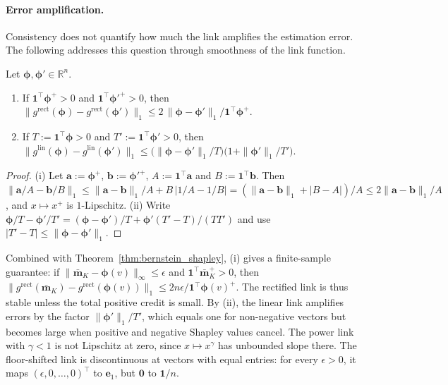 \paragraph{Error amplification.}
Consistency does not quantify how much the link amplifies the estimation error. The following addresses this question through smoothness of the link function.

\begin{proposition}\label{prop:link_lipschitz}
Let $\boldsymbol{\phi}, \boldsymbol{\phi}' \in \mathbb{R}^n$.
\begin{enumerate}
    \item[(i)] If $\mathbf{1}^\top \boldsymbol{\phi}^+ > 0$ and $\mathbf{1}^\top \boldsymbol{\phi}'^+ > 0$, then $\big\| g^{\text{rect}}(\boldsymbol{\phi}) - g^{\text{rect}}(\boldsymbol{\phi}') \big\|_1 \le 2\, \|\boldsymbol{\phi} - \boldsymbol{\phi}'\|_1 / \mathbf{1}^\top \boldsymbol{\phi}^+$.
    \item[(ii)] If $T := \mathbf{1}^\top \boldsymbol{\phi} > 0$ and $T' := \mathbf{1}^\top \boldsymbol{\phi}' > 0$, then $\big\| g^{\text{lin}}(\boldsymbol{\phi}) - g^{\text{lin}}(\boldsymbol{\phi}') \big\|_1 \le \big( \|\boldsymbol{\phi} - \boldsymbol{\phi}'\|_1 / T \big) \big( 1 + \|\boldsymbol{\phi}'\|_1 / T' \big)$.
\end{enumerate}
\end{proposition}

\begin{proof}
(i) Let $\mathbf{a} := \boldsymbol{\phi}^+$, $\mathbf{b} := \boldsymbol{\phi}'^+$, $A := \mathbf{1}^\top \mathbf{a}$ and $B := \mathbf{1}^\top \mathbf{b}$. Then $\|\mathbf{a}/A - \mathbf{b}/B\|_1 \le \|\mathbf{a} - \mathbf{b}\|_1 / A + B\, |1/A - 1/B| = (\|\mathbf{a} - \mathbf{b}\|_1 + |B - A|)/A \le 2\|\mathbf{a} - \mathbf{b}\|_1 / A$, and $x \mapsto x^+$ is $1$-Lipschitz. (ii) Write $\boldsymbol{\phi}/T - \boldsymbol{\phi}'/T' = (\boldsymbol{\phi} - \boldsymbol{\phi}')/T + \boldsymbol{\phi}'(T' - T)/(T T')$ and use $|T' - T| \le \|\boldsymbol{\phi} - \boldsymbol{\phi}'\|_1$.
\end{proof}

Combined with Theorem~\ref{thm:bernstein_shapley}, (i) gives a finite-sample guarantee: if $\|\bar{\mathbf{m}}_K - \boldsymbol{\phi}(v)\|_\infty \le \epsilon$ and $\mathbf{1}^\top \bar{\mathbf{m}}_K^+ > 0$, then $\|g^{\text{rect}}(\bar{\mathbf{m}}_K) - g^{\text{rect}}(\boldsymbol{\phi}(v))\|_1 \le 2n\epsilon / \mathbf{1}^\top \boldsymbol{\phi}(v)^+$. The rectified link is thus stable unless the total positive credit is small. By (ii), the linear link amplifies errors by the factor $\|\boldsymbol{\phi}'\|_1 / T'$, which equals one for non-negative vectors but becomes large when positive and negative Shapley values cancel. The power link with $\gamma < 1$ is not Lipschitz at zero, since $x \mapsto x^\gamma$ has unbounded slope there. The floor-shifted link is discontinuous at vectors with equal entries: for every $\epsilon > 0$, it maps $(\epsilon, 0, \dots, 0)^\top$ to $\mathbf{e}_1$, but $\mathbf{0}$ to $\mathbf{1}/n$.



